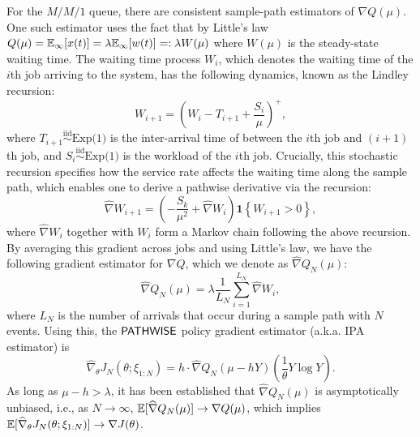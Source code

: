 For the $M/M/1$ queue, there are consistent sample-path estimators of $\nabla Q(\mu)$. One such estimator uses the fact that by Little's law $Q(\mu) = \mathbb{E}_{\infty}[x(t)] = \lambda \mathbb{E}_{\infty}[w(t)] =: \lambda W(\mu)$ where $W(\mu)$ is the steady-state waiting time. The waiting time process $W_{i}$, which denotes the waiting time of the $i$th job arriving to the system, has the following dynamics, known as the Lindley recursion:
\begin{equation}
\label{eq:lindley}
 W_{i+1} = \left( W_{i} - T_{i+1} + \frac{S_{i}}{\mu} \right)^{+},
\end{equation}
where $T_{i+1}\stackrel{\text{iid}}{\sim}\text{Exp(1)}$ is the inter-arrival time of between the $i$th job and $(i+1)$th job, and $S_{i}\stackrel{\text{iid}}{\sim}\text{Exp(1)}$ is the workload of the $i$th job. Crucially, this stochastic recursion specifies how the service rate affects the waiting time along the sample path, which enables one to derive a pathwise derivative via the recursion:
\[
 \widehat{\nabla}W_{i+1} = 
 \left( -\frac{S_{k}}{\mu^{2}} + \widehat{\nabla} W_{i} \right)
 \mathbf{1} \left\{ W_{i+1} > 0 \right\},
\]
where $\widehat{\nabla} W_{i}$ together with $W_i$ form a Markov chain following the above recursion. By averaging this gradient across jobs and using Little's law, we have the following gradient estimator for $\nabla Q$, which we denote as $\widehat{\nabla} Q_{N}(\mu)$: 
\[
\widehat{\nabla} Q_{N}(\mu) = \lambda \frac{1}{L_{N}} \sum_{i=1}^{L_{N}} \widehat{\nabla} W_{i},
\]
where $L_{N}$ is the number of arrivals that occur during a sample path with $N$ events.
Using this, the $\mathsf{PATHWISE}$ policy gradient estimator (a.k.a. IPA estimator) is
\begin{equation}
\label{eq:mm1-pathwise}
\widehat{\nabla}_{\theta} J_{N}(\theta; \xi_{1:N}) 
= h \cdot \widehat{\nabla} Q_{N}(\mu - h Y) \left( \frac{1}{\theta} Y \log Y \right).
\end{equation}
As long as $\mu - h > \lambda$, it has been established that $\widehat{\nabla} Q_{N}(\mu)$ is asymptotically unbiased, i.e., as $N\to \infty$, $\mathbb{E}[\widehat{\nabla} Q_{N}(\mu)] \to \nabla Q(\mu)$, which implies 
$\mathbb{E}[\widehat{\nabla}_{\theta} J_{N}(\theta; \xi_{1:N})] \to \nabla J(\theta)$. 

